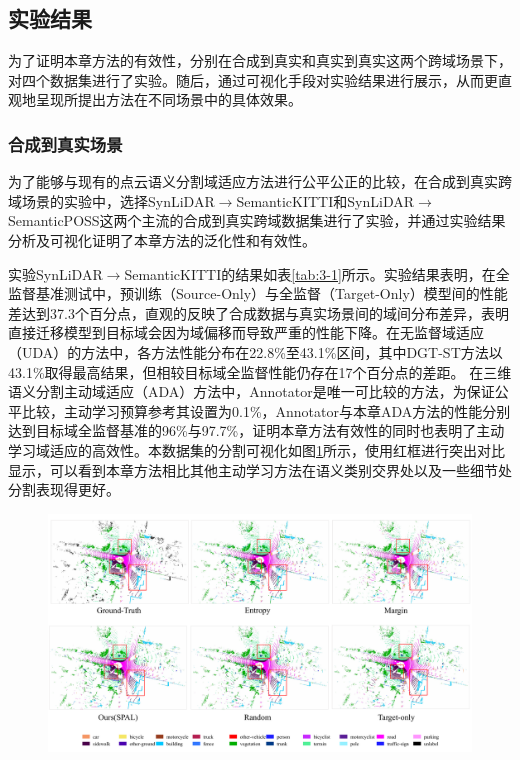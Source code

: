 \subsection{实验结果}
为了证明本章方法的有效性，分别在合成到真实和真实到真实这两个跨域场景下，对四个数据集进行了实验。随后，通过可视化手段对实验结果进行展示，从而更直观地呈现所提出方法在不同场景中的具体效果。
\subsubsection{合成到真实场景}
为了能够与现有的点云语义分割域适应方法进行公平公正的比较，在合成到真实跨域场景的实验中，选择SynLiDAR\(\to\)SemanticKITTI和SynLiDAR\(\to\)SemanticPOSS这两个主流的合成到真实跨域数据集进行了实验，并通过实验结果分析及可视化证明了本章方法的泛化性和有效性。

\vspace{-0.1cm}
实验SynLiDAR\(\to\)SemanticKITTI的结果如表\ref{tab:3-1}所示。实验结果表明，在全监督基准测试中，预训练（Source-Only）与全监督（Target-Only）模型间的性能差达到37.3个百分点，直观的反映了合成数据与真实场景间的域间分布差异，表明直接迁移模型到目标域会因为域偏移而导致严重的性能下降。在无监督域适应（UDA）的方法中，各方法性能分布在22.8\%至43.1\%区间，其中DGT-ST方法以43.1\%取得最高结果，但相较目标域全监督性能仍存在17个百分点的差距。
在三维语义分割主动域适应（ADA）方法中，Annotator是唯一可比较的方法，为保证公平比较，主动学习预算参考其设置为0.1\%，Annotator与本章ADA方法的性能分别达到目标域全监督基准的96\%与97.7\%，证明本章方法有效性的同时也表明了主动学习域适应的高效性。本数据集的分割可视化如图\ref{fig:3-v-1}所示，使用红框进行突出对比显示，可以看到本章方法相比其他主动学习方法在语义类别交界处以及一些细节处分割表现得更好。
\vspace{-0.1cm}
\begin{figure}[H]
    \centering
    \includegraphics[width = \textwidth]{ljx/figure/3_vision_s2k1.pdf}
    \label{fig:3-v-1}
\end{figure}
